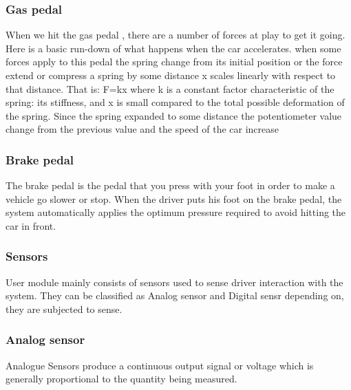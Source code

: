 \documentclass[12pt,a4paper]{article}
\begin{document}
\begin{center}
\begin{center}
\subsubsection*{Gas pedal}
When we hit the gas pedal , there are a number of forces at play to get it going. Here is a basic run-down of what happens when the car accelerates. when some forces apply to this pedal the spring  change from its initial position or the force extend or compress a spring by some distance x scales linearly with respect to that distance. That is: F=kx where k is a constant factor characteristic of the spring: its stiffness, and x is small compared to the total possible deformation of the spring. Since the spring expanded to some distance the potentiometer value change from the previous value and the speed of the car increase  
\subsubsection*{Brake pedal}
The brake pedal is the pedal that you press with your foot in order to make a vehicle go slower or stop. When the driver puts his foot on the brake pedal, the system automatically applies the optimum pressure required to avoid hitting the car in front.
\subsubsection{Sensors}
User module mainly consists of sensors used to sense driver interaction with the system. They can be classified as Analog sensor and Digital sensr depending on, they are subjected to sense.
\subsubsection*{Analog sensor}
Analogue Sensors produce a continuous output signal or voltage which is generally proportional to the quantity being measured.\\


\end{center}
\end{center}
\end{document}
